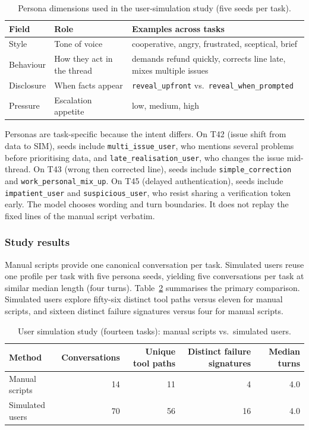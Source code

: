\begin{table}[htbp]
\centering
\caption{Persona dimensions used in the user-simulation study (five seeds per task).}
\label{tab:persona-dimensions}
\small
\begin{tabular}{@{}llp{5.5cm}@{}}
\toprule
Field & Role & Examples across tasks \\
\midrule
Style & Tone of voice & cooperative, angry, frustrated, sceptical, brief \\
Behaviour & How they act in the thread & demands refund quickly, corrects line late, mixes multiple issues \\
Disclosure & When facts appear & \texttt{reveal\_upfront} vs.\ \texttt{reveal\_when\_prompted} \\
Pressure & Escalation appetite & low, medium, high \\
\bottomrule
\end{tabular}
\end{table}

Personas are task-specific because the intent differs. On T42 (issue shift from data to SIM), seeds include \texttt{multi\_issue\_user}, who mentions several problems before prioritising data, and \texttt{late\_realisation\_user}, who changes the issue mid-thread. On T43 (wrong then corrected line), seeds include \texttt{simple\_correction} and \texttt{work\_personal\_mix\_up}. On T45 (delayed authentication), seeds include \texttt{impatient\_user} and \texttt{suspicious\_user}, who resist sharing a verification token early. The model chooses wording and turn boundaries. It does not replay the fixed lines of the manual script verbatim.

\subsubsection{Study results}

Manual scripts provide one canonical conversation per task. Simulated users reuse one profile per task with five persona seeds, yielding five conversations per task at similar median length (four turns). Table~\ref{tab:user-sim-primary} summarises the primary comparison. Simulated users explore fifty-six distinct tool paths versus eleven for manual scripts, and sixteen distinct failure signatures versus four for manual scripts.

\begin{table}[htbp]
\centering
\caption{User simulation study (fourteen tasks): manual scripts vs.\ simulated users.}
\label{tab:user-sim-primary}
\begin{tabular}{@{}lrrrr@{}}
\toprule
Method & Conversations & Unique tool paths & Distinct failure signatures & Median turns \\
\midrule
Manual scripts & 14 & 11 & 4 & 4.0 \\
Simulated users & 70 & 56 & 16 & 4.0 \\
\bottomrule
\end{tabular}
\end{table}

